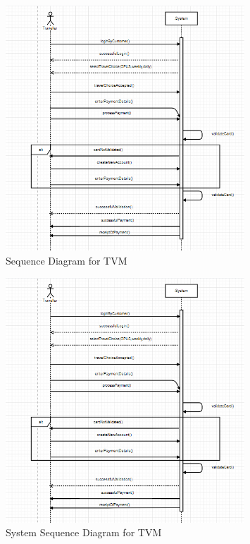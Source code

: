 \documentclass[11pt, english]{report}
\begin{document}

\begin{figure}[H]
  
  \includegraphics[width=0.8\textwidth]{images/ssd.png}
  \centering
   \caption{Sequence Diagram for TVM}

\end{figure}

\begin{figure}[H]
  
  \includegraphics[width=0.8\textwidth]{images/SSD.PNG}
  \centering

   \caption{System Sequence Diagram for TVM}

\end{figure}
\end{document}
